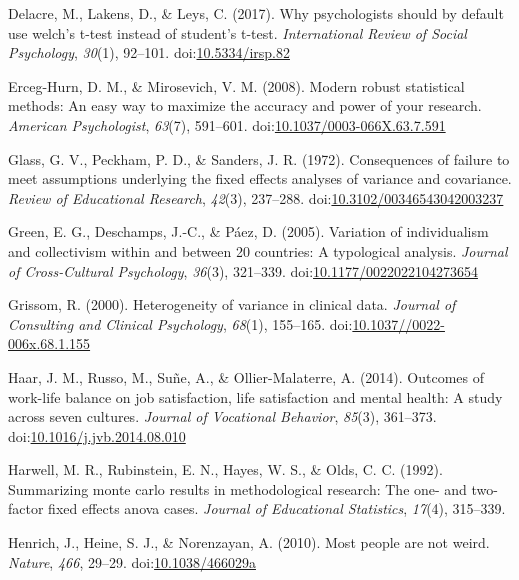 \documentclass[man,floatsintext]{apa6}
\begin{document}
\leavevmode\hypertarget{ref-Delacre_et_al_2017}{}%
Delacre, M., Lakens, D., \& Leys, C. (2017). Why psychologists should by default use welch's t-test instead of student's t-test. \emph{International Review of Social Psychology}, \emph{30}(1), 92--101. doi:\href{https://doi.org/10.5334/irsp.82}{10.5334/irsp.82}

\leavevmode\hypertarget{ref-Erceg-Hurn_Mirosevich_2008}{}%
Erceg-Hurn, D. M., \& Mirosevich, V. M. (2008). Modern robust statistical methods: An easy way to maximize the accuracy and power of your research. \emph{American Psychologist}, \emph{63}(7), 591--601. doi:\href{https://doi.org/10.1037/0003-066X.63.7.591}{10.1037/0003-066X.63.7.591}

\leavevmode\hypertarget{ref-Glass_et_al_1972}{}%
Glass, G. V., Peckham, P. D., \& Sanders, J. R. (1972). Consequences of failure to meet assumptions underlying the fixed effects analyses of variance and covariance. \emph{Review of Educational Research}, \emph{42}(3), 237--288. doi:\href{https://doi.org/10.3102/00346543042003237}{10.3102/00346543042003237}

\leavevmode\hypertarget{ref-Green_et_al_2005}{}%
Green, E. G., Deschamps, J.-C., \& Páez, D. (2005). Variation of individualism and collectivism within and between 20 countries: A typological analysis. \emph{Journal of Cross-Cultural Psychology}, \emph{36}(3), 321--339. doi:\href{https://doi.org/10.1177/0022022104273654}{10.1177/0022022104273654}

\leavevmode\hypertarget{ref-Grissom_2000}{}%
Grissom, R. (2000). Heterogeneity of variance in clinical data. \emph{Journal of Consulting and Clinical Psychology}, \emph{68}(1), 155--165. doi:\href{https://doi.org/10.1037//0022-006x.68.1.155}{10.1037//0022-006x.68.1.155}

\leavevmode\hypertarget{ref-Haar_et_al_2014}{}%
Haar, J. M., Russo, M., Suñe, A., \& Ollier-Malaterre, A. (2014). Outcomes of work-life balance on job satisfaction, life satisfaction and mental health: A study across seven cultures. \emph{Journal of Vocational Behavior}, \emph{85}(3), 361--373. doi:\href{https://doi.org/10.1016/j.jvb.2014.08.010}{10.1016/j.jvb.2014.08.010}

\leavevmode\hypertarget{ref-Harwell_et_al_1992}{}%
Harwell, M. R., Rubinstein, E. N., Hayes, W. S., \& Olds, C. C. (1992). Summarizing monte carlo results in methodological research: The one- and two-factor fixed effects anova cases. \emph{Journal of Educational Statistics}, \emph{17}(4), 315--339.

\leavevmode\hypertarget{ref-Henrich_et_al_2010}{}%
Henrich, J., Heine, S. J., \& Norenzayan, A. (2010). Most people are not weird. \emph{Nature}, \emph{466}, 29--29. doi:\href{https://doi.org/10.1038/466029a\%20}{10.1038/466029a }
\end{document}
